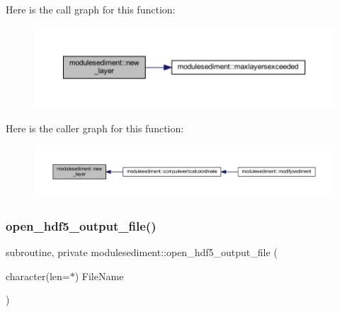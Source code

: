 Here is the call graph for this function\+:\nopagebreak
\begin{figure}[H]
\begin{center}
\leavevmode
\includegraphics[width=350pt]{namespacemodulesediment_acfebb5e32f4481cbb0199b98dc4ff545_cgraph}
\end{center}
\end{figure}
Here is the caller graph for this function\+:\nopagebreak
\begin{figure}[H]
\begin{center}
\leavevmode
\includegraphics[width=350pt]{namespacemodulesediment_acfebb5e32f4481cbb0199b98dc4ff545_icgraph}
\end{center}
\end{figure}
\mbox{\label{namespacemodulesediment_afe850b14e10e8db70a1bd5879fc5c2ea}} 
\subsubsection{\texorpdfstring{open\+\_\+hdf5\+\_\+output\+\_\+file()}{open\_hdf5\_output\_file()}}
{\footnotesize\ttfamily subroutine, private modulesediment\+::open\+\_\+hdf5\+\_\+output\+\_\+file (\begin{DoxyParamCaption}\item[{character(len=$\ast$)}]{File\+Name }\end{DoxyParamCaption})\hspace{0.3cm}{\ttfamily [private]}}

